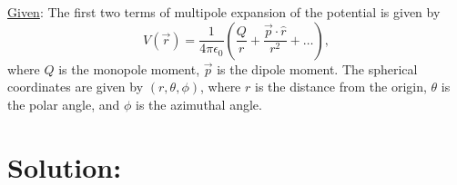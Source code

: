 \vspace{0.5cm}
\noindent
\underline{Given}: The first two terms of multipole expansion of the potential is given by 
\begin{equation*}
    V(\vec{r}) = \frac{1}{4\pi\epsilon_0} \left( \frac{Q}{r} + \frac{\vec{p}\cdot\hat{r}}{r^2} + \hdots \right),
\end{equation*}
where $Q$ is the monopole moment, $\vec{p}$ is the dipole moment. The spherical coordinates are given by $(r,\theta,\phi)$, where $r$ is the distance from the origin, $\theta$ is the polar angle, and $\phi$ is the azimuthal angle.
 \section*{Solution:}
